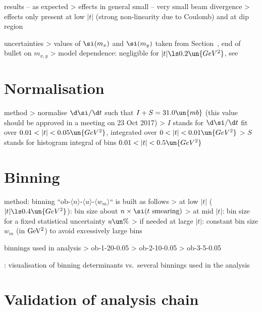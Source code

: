 \> results -- as expected
\>> effects in general small -- very small beam divergence
\>> effects only present at low $|t|$ (strong non-linearity due to Coulomb) and at dip region

\> uncertainties
\>> values of $\si(m_x)$ and $\si(m_y)$ taken from Section~, end of bullet on $m_{x,y}$
\>> model dependence: negligible for $|t| \ls 0.2\un{GeV^2}$, see 



\section[normalisation]{Normalisation}

\> method
\>> normalise $\d\si/\d t$ such that $I + S = 31.0\un{mb}$ (this value should be approved in a meeting on 23 Oct 2017)
\>> $I$ stands for $\d\si/\d t$ fit over $0.01 < |t| < 0.05\un{GeV^2}$, integrated over $0 < |t| < 0.01\un{GeV^2}$
\>> $S$ stands for histogram integral of bins $0.01 < |t| < 0.5\un{GeV^2}$



\section[binning]{Binning}

\> method: binning ``ob-$\langle n\rangle$-$\langle u\rangle$-$\langle w_m\rangle$`` is built as follows
\>> at low $|t|$ ($|t| \ls 0.4\un{GeV^2}$): bin size about $n\times \si(\hbox{$t$ smearing})$
\>> at mid $|t|$: bin size for a fixed statistical uncertainty $u\un{\%}$
\>> if needed at large $|t|$: constant bin size $w_m$ (in $\rm GeV^2$) to avoid excessively large bins

\> binnings used in analysis
\>> ob-1-20-0.05
\>> ob-2-10-0.05
\>> ob-3-5-0.05

\>  : visualisation of binning determinants vs.~several binnings used in
the analysis



\section[validation]{Validation of analysis chain}

